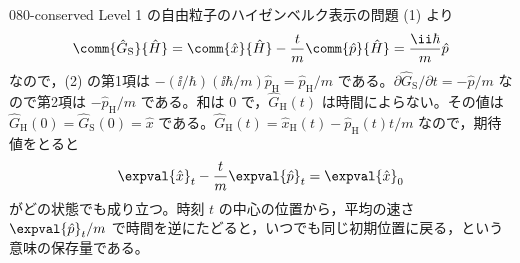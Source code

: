 \documentclass[uplatex,dvipdfmx,a4paper,11pt]{jsarticle}
\begin{document}
\begin{kaisetsu}{080-conserved}
 Level 1 の自由粒子のハイゼンベルク表示の問題 (1) より
\[ \comm{\hat{G}_{\mathrm{S}}}{\hat{H}}=\comm{\hat{x}}{\hat{H}}-\frac{t}{m}\comm{\hat{p}}{\hat{H}}=\frac{\ii\hbar}{m}\hat{p} \]
なので，(2) の第1項は $-(\ii/\hbar)(\ii\hbar/m)\hat{p}_{\mathrm{H}}=\hat{p}_{\mathrm{H}}/m$ である。$\partial\hat{G}_{\mathrm{S}}/\partial t=-\hat{p}/m$ なので第2項は $-\hat{p}_{\mathrm{H}}/m$ である。和は $0$ で，$\hat{G}_{\mathrm{H}}(t)$ は時間によらない。その値は $\hat{G}_{\mathrm{H}}(0)=\hat{G}_{\mathrm{S}}(0)=\hat{x}$ である。$\hat{G}_{\mathrm{H}}(t)=\hat{x}_{\mathrm{H}}(t)-\hat{p}_{\mathrm{H}}(t)t/m$ なので，期待値をとると
\[ \expval{\hat{x}}_{t}-\frac{t}{m}\expval{\hat{p}}_{t}=\expval{\hat{x}}_{0} \]
がどの状態でも成り立つ。時刻 $t$ の中心の位置から，平均の速さ $\expval{\hat{p}}_{t}/m$ で時間を逆にたどると，いつでも同じ初期位置に戻る，という意味の保存量である。


\end{kaisetsu}
\end{document}
